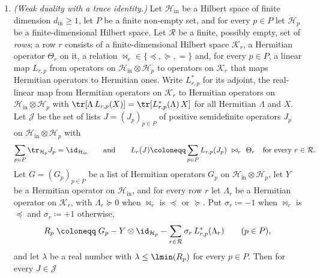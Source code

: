 \begin{lemma}\label{lem:feasible-side-dual}
\begin{enumerate}[label=(\roman*),leftmargin=2.2em]
\item \emph{(Weak duality with a trace identity.)} Let
  $\mathcal{H}_{\mathrm{in}}$ be a Hilbert space of finite dimension
  $d_{\mathrm{in}}\ge1$, let $P$ be a finite non-empty set, and for every
  $p\in P$ let $\mathcal{H}_p$ be a finite-dimensional Hilbert space. Let
  $\mathcal{R}$ be a finite, possibly empty, set of \emph{rows}; a row $r$
  consists of a finite-dimensional Hilbert space $\mathcal{K}_r$, a
  Hermitian operator $\Theta_r$ on it, a relation
  $\bowtie_r\in\{\preceq,\succeq,=\}$ and, for every $p\in P$, a linear map
  $L_{r,p}$ from operators on $\mathcal{H}_{\mathrm{in}}\otimes\mathcal{H}_p$
  to operators on $\mathcal{K}_r$ that maps Hermitian operators to Hermitian
  ones. Write $L^{*}_{r,p}$ for its adjoint, the real-linear map from
  Hermitian operators on $\mathcal{K}_r$ to Hermitian operators on
  $\mathcal{H}_{\mathrm{in}}\otimes\mathcal{H}_p$ with
  $\tr[\Lambda\,L_{r,p}(X)]=\tr[L^{*}_{r,p}(\Lambda)\,X]$ for all Hermitian
  $\Lambda$ and $X$. Let $\mathcal{J}$ be the set of lists
  $J=(J_p)_{p\in P}$ of positive semidefinite operators $J_p$ on
  $\mathcal{H}_{\mathrm{in}}\otimes\mathcal{H}_p$ with
  \begin{equation}\label{eq:abstract-feasible}
    \sum_{p\in P}\tr_{\mathcal{H}_p}J_p=\id_{\mathcal{H}_{\mathrm{in}}}
    \qquad\text{and}\qquad
    L_r(J)\coloneqq\sum_{p\in P}L_{r,p}(J_p)\ \bowtie_r\ \Theta_r
    \quad\text{for every }r\in\mathcal{R}.
  \end{equation}
  Let $G=(G_p)_{p\in P}$ be a list of Hermitian operators $G_p$ on
  $\mathcal{H}_{\mathrm{in}}\otimes\mathcal{H}_p$, let $Y$ be a Hermitian
  operator on $\mathcal{H}_{\mathrm{in}}$, and for every row $r$ let
  $\Lambda_r$ be a Hermitian operator on $\mathcal{K}_r$, with
  $\Lambda_r\succeq0$ when $\bowtie_r$ is $\preceq$ or $\succeq$. Put
  $\sigma_r\coloneqq-1$ when $\bowtie_r$ is $\preceq$ and
  $\sigma_r\coloneqq+1$ otherwise,
  \begin{equation}\label{eq:dual-residual}
    R_p\;\coloneqq\;G_p-Y\otimes\id_{\mathcal{H}_p}
    -\sum_{r\in\mathcal{R}}\sigma_r\,L^{*}_{r,p}(\Lambda_r)
    \qquad(p\in P),
  \end{equation}
  and let $\lambda$ be a real number with $\lambda\le\lmin(R_p)$ for every
  $p\in P$. Then for every $J\in\mathcal{J}$
  \begin{equation}\label{eq:feasible-side-dual}

\end{equation}
\end{enumerate}
\end{lemma}
